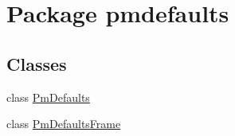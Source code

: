 \hypertarget{namespacepmdefaults}{}\section{Package pmdefaults}
\label{namespacepmdefaults}
\subsection*{Classes}
\begin{DoxyCompactItemize}
\item 
class \hyperlink{classpmdefaults_1_1_pm_defaults}{Pm\+Defaults}
\item 
class \hyperlink{classpmdefaults_1_1_pm_defaults_frame}{Pm\+Defaults\+Frame}
\end{DoxyCompactItemize}
